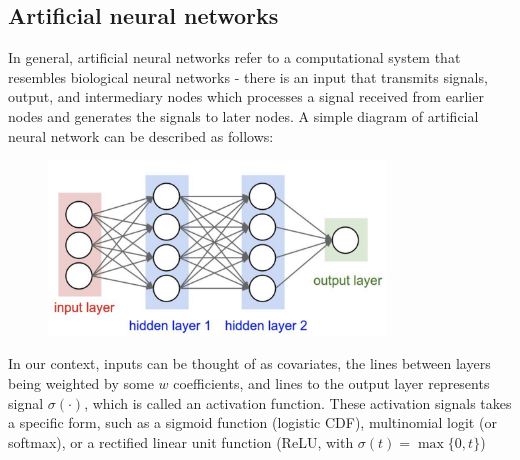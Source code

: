 \documentclass[12pt]{article}
\theoremstyle{definition}
\theoremstyle{property}
\theoremstyle{assumption}
\theoremstyle{example}
\theoremstyle{comment}
\begin{document}
\subsection{Artificial neural networks}
In general, artificial neural networks refer to a computational system that resembles biological neural networks - there is an input that transmits signals, output, and intermediary nodes which processes a signal received from earlier nodes and generates the signals to later nodes. A simple diagram of artificial neural network can be described as follows:

\begin{figure}[H]
\centering
\includegraphics[width=0.8\textwidth, keepaspectratio]{neuralnetwork.png}
\end{figure}
\par
In our context, inputs can be thought of as covariates, the lines between layers being weighted by some $w$ coefficients, and lines to the output layer represents signal $\sigma(\cdot)$, which is called an activation function. These activation signals takes a specific form, such as a sigmoid function (logistic CDF), multinomial logit (or softmax), or a rectified linear unit function (ReLU, with $\sigma(t)=\max\{0,t\}$) \par
\end{document}

